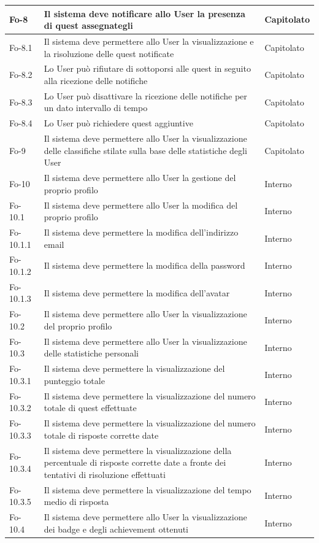 \documentclass[10pt,a4paper]{article}
\begin{document}
\begin{longtable}{|p{}|p{}|p{}|}
\hline
Fo-8 & Il sistema deve notificare allo User la presenza di quest assegnategli & Capitolato\\
\hline
Fo-8.1 & Il sistema deve permettere allo User la visualizzazione e la risoluzione delle quest notificate & Capitolato\\
\hline
Fo-8.2 & Lo User può rifiutare di sottoporsi alle quest in seguito alla ricezione delle notifiche & Capitolato\\
\hline
Fo-8.3 & Lo User può disattivare la ricezione delle notifiche per un dato intervallo di tempo & Capitolato\\
\hline
Fo-8.4 & Lo User può richiedere quest aggiuntive & Capitolato\\
\hline
Fo-9 & Il sistema deve permettere allo User la visualizzazione delle classifiche stilate sulla base delle statistiche degli User & Capitolato\\
\hline
Fo-10 & Il sistema deve permettere allo User la gestione del proprio profilo & Interno\\
\hline
Fo-10.1 & Il sistema deve permettere allo User la modifica del proprio profilo & Interno\\
\hline
Fo-10.1.1 & Il sistema deve permettere la modifica dell'indirizzo email & Interno\\
\hline
Fo-10.1.2 & Il sistema deve permettere la modifica della password & Interno\\
\hline
Fo-10.1.3 & Il sistema deve permettere la modifica dell'avatar & Interno\\
\hline
Fo-10.2 & Il sistema deve permettere allo User la visualizzazione del proprio profilo & Interno\\
\hline
Fo-10.3 & Il sistema deve permettere allo User la visualizzazione delle statistiche personali & Interno\\
\hline
Fo-10.3.1 & Il sistema deve permettere la visualizzazione del punteggio totale & Interno\\
\hline
Fo-10.3.2 & Il sistema deve permettere la visualizzazione del numero totale di quest effettuate & Interno\\
\hline
Fo-10.3.3 & Il sistema deve permettere la visualizzazione del numero totale di risposte corrette date & Interno\\
\hline
Fo-10.3.4 & Il sistema deve permettere la visualizzazione della percentuale di risposte corrette date a fronte dei tentativi di risoluzione effettuati & Interno\\
\hline
Fo-10.3.5 & Il sistema deve permettere la visualizzazione del tempo medio di risposta & Interno\\
\hline
Fo-10.4 & Il sistema deve permettere allo User la visualizzazione dei badge e degli achievement ottenuti & Interno\\

\end{longtable}
\end{document}
